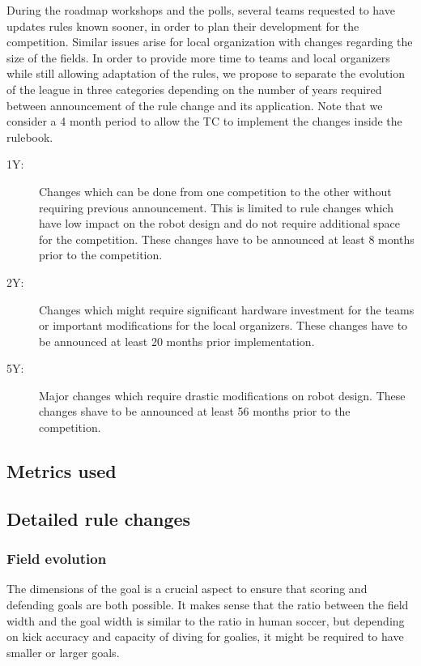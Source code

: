 \documentclass{article}
\begin{document}
During the roadmap workshops and the polls, several teams requested to have
updates rules known sooner, in order to plan their development for the
competition. Similar issues arise for local organization with changes regarding
the size of the fields. In order to provide more time to teams and local
organizers while still allowing adaptation of the rules, we propose to separate
the evolution of the league in three categories depending on the number of years
required between announcement of the rule change and its application. Note that
we consider a 4 month period to allow the TC to implement the changes inside the
rulebook.
\begin{description}
\item[1Y:] Changes which can be done from one competition to the other without
  requiring previous announcement. This is limited to rule changes which have
  low impact on the robot design and do not require additional space for the
  competition. These changes have to be announced at least 8 months prior
  to the competition.
\item[2Y:] Changes which might require significant hardware investment for the
  teams or important modifications for the local organizers. These changes have
  to be announced at least 20 months prior implementation.
\item[5Y:] Major changes which require drastic modifications on robot design.
  These changes shave to be announced at least 56 months prior to the
  competition.
\end{description}


\subsection{Metrics used}

\subsection{Detailed rule changes}

\subsubsection{Field evolution}
The dimensions of the goal is a crucial aspect to ensure that scoring and
defending goals are both possible. It makes sense that the ratio between the
field width and the goal width is similar to the ratio in human soccer, but
depending on kick accuracy and capacity of diving for goalies, it might be
required to have smaller or larger goals.
\end{document}
